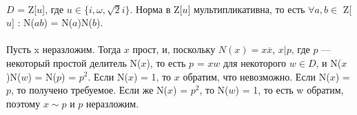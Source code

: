 \ \\$D$ = Z[$u$], где $u \in \{i, \omega, \sqrt{2}i\}.$ Норма в Z[$u$] мультипликативна, то есть $\forall a, b \in$ Z[$u$] : N($ab$) = N($a$)N($b$).
\\ 
\\
\Proof Пусть x неразложим. Тогда $x$ прост, и, поскольку $N(x) = x\overline{x}$, $x | p$, где $p$ — некоторый простой делитель N($x$), то есть $p$ = $xw$ для некоторого $w \in D$, и N($x$)N($w$) = N($p$) = $p^2$. Если N($x$) = 1, то $x$ обратим, что невозможно. Если N($x$) = $p$, то
получено требуемое. Если же N($x$) = $p^2$, то N($w$) = 1, то есть w обратим, поэтому
$x \sim p$ и $p$ неразложим. \EndProof